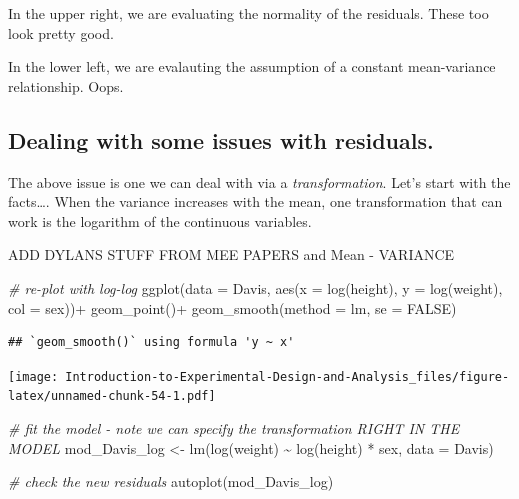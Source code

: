 \documentclass[
]{book}
\newenvironment{Shaded}{\begin{snugshade}}{\end{snugshade}}
\newcommand{\AttributeTok}[1]{\textcolor[rgb]{0.77,0.63,0.00}{#1}}
\newcommand{\CommentTok}[1]{\textcolor[rgb]{0.56,0.35,0.01}{\textit{#1}}}
\newcommand{\ConstantTok}[1]{\textcolor[rgb]{0.00,0.00,0.00}{#1}}
\newcommand{\FunctionTok}[1]{\textcolor[rgb]{0.00,0.00,0.00}{#1}}
\newcommand{\NormalTok}[1]{#1}
\newcommand{\OtherTok}[1]{\textcolor[rgb]{0.56,0.35,0.01}{#1}}
\newcommand{\SpecialCharTok}[1]{\textcolor[rgb]{0.00,0.00,0.00}{#1}}
\begin{document}
In the upper right, we are evaluating the normality of the residuals. These too look pretty good.

In the lower left, we are evalauting the assumption of a constant mean-variance relationship. Oops.

\hypertarget{dealing-with-some-issues-with-residuals.}{%
\subsection{Dealing with some issues with residuals.}\label{dealing-with-some-issues-with-residuals.}}

The above issue is one we can deal with via a \emph{transformation}. Let's start with the facts\ldots. When the variance increases with the mean, one transformation that can work is the logarithm of the continuous variables.

ADD DYLANS STUFF FROM MEE PAPERS and Mean - VARIANCE

\begin{Shaded}
\begin{Highlighting}[]
\CommentTok{\# re{-}plot with log{-}log}
\FunctionTok{ggplot}\NormalTok{(}\AttributeTok{data =}\NormalTok{ Davis, }\FunctionTok{aes}\NormalTok{(}\AttributeTok{x =} \FunctionTok{log}\NormalTok{(height), }\AttributeTok{y =} \FunctionTok{log}\NormalTok{(weight), }\AttributeTok{col =}\NormalTok{ sex))}\SpecialCharTok{+}
  \FunctionTok{geom\_point}\NormalTok{()}\SpecialCharTok{+}
  \FunctionTok{geom\_smooth}\NormalTok{(}\AttributeTok{method =}\NormalTok{ lm, }\AttributeTok{se =} \ConstantTok{FALSE}\NormalTok{)}
\end{Highlighting}
\end{Shaded}

\begin{verbatim}
## `geom_smooth()` using formula 'y ~ x'
\end{verbatim}

\texttt{[image: Introduction-to-Experimental-Design-and-Analysis\_files/figure-latex/unnamed-chunk-54-1.pdf]}

\begin{Shaded}
\begin{Highlighting}[]
\CommentTok{\# fit the model {-} note we can specify the transformation RIGHT IN THE MODEL}
\NormalTok{mod\_Davis\_log }\OtherTok{\textless{}{-}} \FunctionTok{lm}\NormalTok{(}\FunctionTok{log}\NormalTok{(weight) }\SpecialCharTok{\textasciitilde{}} \FunctionTok{log}\NormalTok{(height) }\SpecialCharTok{*}\NormalTok{ sex, }\AttributeTok{data =}\NormalTok{ Davis)}

\CommentTok{\# check the new residuals}
\FunctionTok{autoplot}\NormalTok{(mod\_Davis\_log)}
\end{Highlighting}
\end{Shaded}
\end{document}
